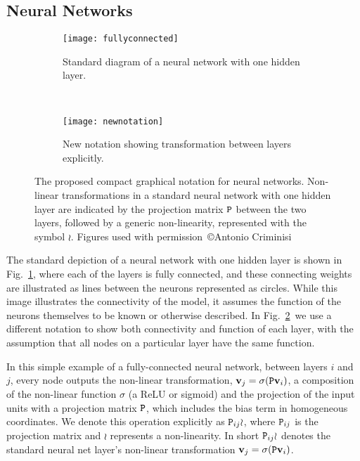 \documentclass[thesis]{subfiles}
\begin{document}
\subsection{Neural Networks}
\begin{figure}[htbp!] 
\centering
\begin{subfigure}[b]{0.45\textwidth}
   \centering
   \texttt{[image: fullyconnected]}
   \caption{Standard diagram of a neural network with one hidden layer.}
   \label{fig:oldnotation}
\end{subfigure}
~
\begin{subfigure}[b]{0.45\textwidth}
   \centering
   \texttt{[image: newnotation]}
   \caption{New notation showing transformation between layers explicitly.}
   \label{fig:newnotation}
\end{subfigure}
\caption[New graphical notation for a standard neural network with one hidden layer.]{The proposed compact graphical notation for neural networks. Non-linear transformations in a standard neural network with one hidden layer are indicated by the projection matrix $\mat P$ between the two layers, followed by a generic non-linearity, represented with the symbol $\wr$. Figures used with permission~\copyright Antonio Criminisi}
\label{fig:newGraphLanguage}
\end{figure}

The standard depiction of a neural network with one hidden layer is shown in Fig.~\ref{fig:oldnotation}, where each of the layers is fully connected, and these connecting weights are illustrated as lines between the neurons represented as circles. While this image illustrates the connectivity of the model, it assumes the function of the neurons themselves to be known or otherwise described. In Fig.~\ref{fig:newnotation}\ we use a different notation to show both connectivity and function of each layer, with the assumption that all nodes on a particular layer have the same function.

In this simple example of a fully-connected neural network, between layers $i$ and $j$, every node outputs the non-linear transformation, $\vec v_j = \sigma(\mat P \vec v_i)$, a composition of the non-linear function $\sigma$ (\eg a ReLU or sigmoid) and the projection of the input units with a projection matrix $\mat P$, which includes the bias term in homogeneous coordinates. We denote this operation explicitly as $\mat P_{ij} \wr$, where $\mat P_{ij}$ is the projection matrix and $\wr$ represents a non-linearity. In short $\mat P_{ij} \wr$ denotes the standard neural net layer's non-linear transformation $\vec v_j = \sigma(\mat P \vec v_i)$. 
\end{document}
